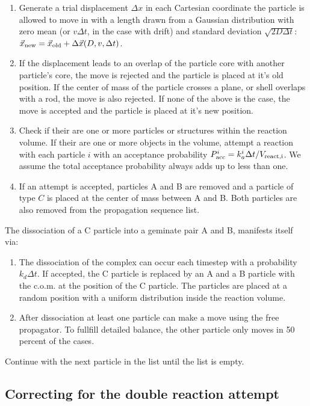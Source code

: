 \begin{enumerate}
\item Generate a trial displacement $\Delta x$ in each Cartesian coordinate the particle is allowed to move in with a length drawn from a Gaussian distribution with zero mean (or $v \Delta t$, in the case with drift) and standard deviation $\sqrt{2D\Delta t}$: $\vec{x}_{\rm new} = \vec{x}_{\rm old} + \Delta \vec{x}(D,v,\Delta t)$.
\item If the displacement leads to an overlap of the particle core with another particle's core, the move is rejected and the particle is placed at it's old position. If the center of mass of the particle crosses a plane, or shell overlaps with a rod, the move is also rejected. If none of the above is the case, the move is accepted and the particle is placed at it's new position.
\item Check if their are one or more particles or structures within the reaction volume. If their are one or more objects in the volume, attempt a reaction with each particle $i$ with an acceptance probability $P_{\rm acc}^i = k_{a}^i \Delta t/V_{\rm react, i}$. We assume the total acceptance probability always adds up to less than one. 
\item If an attempt is accepted, particles A and B are removed and a particle of type $C$ is placed at the center of mass between A and B. Both particles are also removed from the propagation sequence list. 
\end{enumerate}

The dissociation of a C particle into a geminate pair A and B, manifests itself via:

\begin{enumerate}
\item The dissociation of the complex can occur each timestep with a probability $k_d \Delta t$. If accepted, the C particle is replaced by an A and a B particle with the c.o.m. at the position of the C particle. The particles are placed at a random position with a uniform distribution inside the reaction volume.
\item After dissociation at least one particle can make a move using the free propagator. To fullfill detailed balance, the other particle only moves in 50 percent of the cases. 
\end{enumerate}
Continue with the next particle in the list until the list is empty.


\subsection{Correcting for the double reaction attempt}

